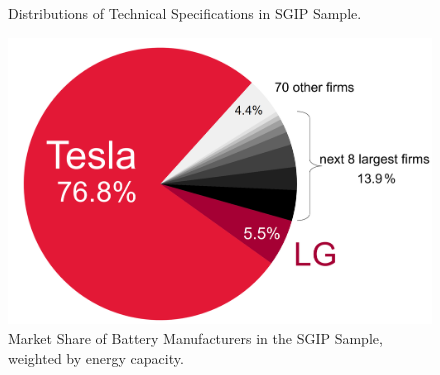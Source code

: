 \documentclass[preprint,12pt,authoryear]{elsarticle}
\begin{document}
\begin{figure}[p]
\centering
\caption{Distributions of Technical Specifications in SGIP Sample.}\label{fig:sgip_kWh_hist}

\bigskip
\bigskip
\bigskip
\bigskip

\includegraphics[width=\textwidth]{CA_SGIP/manufacturer_shares.png}
\caption{Market Share of Battery Manufacturers in the SGIP Sample, weighted by energy capacity.}\label{fig:manufacturer_shares}
\end{figure}
\end{document}
